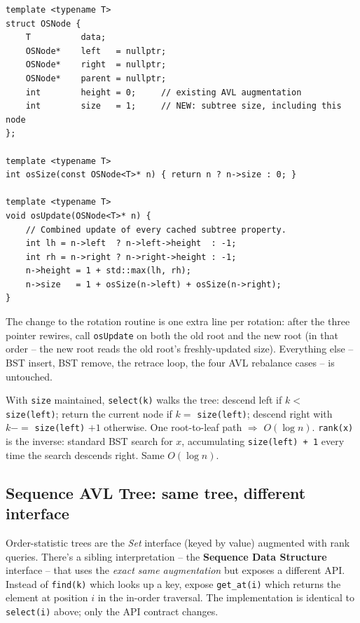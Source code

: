 \documentclass[11pt]{article}
\begin{document}
\begin{lstlisting}
template <typename T>
struct OSNode {
    T          data;
    OSNode*    left   = nullptr;
    OSNode*    right  = nullptr;
    OSNode*    parent = nullptr;
    int        height = 0;     // existing AVL augmentation
    int        size   = 1;     // NEW: subtree size, including this node
};

template <typename T>
int osSize(const OSNode<T>* n) { return n ? n->size : 0; }

template <typename T>
void osUpdate(OSNode<T>* n) {
    // Combined update of every cached subtree property.
    int lh = n->left  ? n->left->height  : -1;
    int rh = n->right ? n->right->height : -1;
    n->height = 1 + std::max(lh, rh);
    n->size   = 1 + osSize(n->left) + osSize(n->right);
}
\end{lstlisting}

The change to the rotation routine is one extra line per rotation:
after the three pointer rewires, call \texttt{osUpdate} on both
the old root and the new root (in that order -- the new root reads
the old root's freshly-updated size). Everything else -- BST
insert, BST remove, the retrace loop, the four AVL rebalance
cases -- is untouched.

With \texttt{size} maintained, \texttt{select(k)} walks the tree:
descend left if $k < $ \texttt{size(left)}; return the current
node if $k = $ \texttt{size(left)}; descend right with
$k \mathbin{-\!\!=} $ \texttt{size(left)} $+ 1$ otherwise. One
root-to-leaf path $\Rightarrow$ $O(\log n)$. \texttt{rank(x)} is
the inverse: standard BST search for $x$, accumulating
\texttt{size(left) + 1} every time the search descends right.
Same $O(\log n)$.

\subsection*{Sequence AVL Tree: same tree, different interface}

Order-statistic trees are the \emph{Set} interface
(keyed by value) augmented with rank queries. There's a sibling
interpretation -- the \textbf{Sequence Data Structure} interface
-- that uses the \emph{exact same augmentation} but exposes a
different API. Instead of \texttt{find(k)} which looks up a key,
expose \texttt{get\_at(i)} which returns the element at position
$i$ in the in-order traversal. The implementation is identical to
\texttt{select(i)} above; only the API contract changes.
\end{document}

